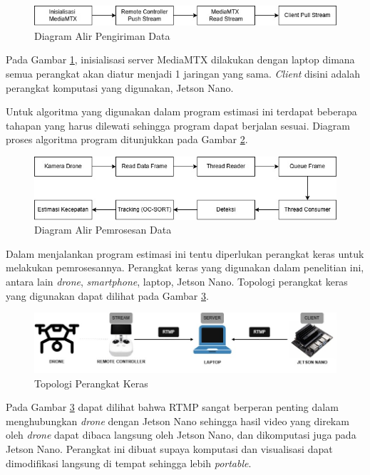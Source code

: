 \begin{figure} [H] \centering
  \includegraphics[scale=0.7]{bab3/pengirimandata.jpg}
  \caption{Diagram Alir Pengiriman Data}
  \label{fig:alurdata}
\end{figure}

Pada Gambar \ref{fig:alurdata}, inisialisasi server MediaMTX dilakukan dengan laptop dimana semua perangkat akan diatur menjadi 1 jaringan yang sama. \emph{Client} disini adalah perangkat komputasi yang digunakan, Jetson Nano.

Untuk algoritma yang digunakan dalam program estimasi ini terdapat beberapa tahapan yang harus dilewati sehingga program dapat berjalan sesuai. Diagram proses algoritma program ditunjukkan pada Gambar \ref{fig:diagramproses}.

\begin{figure} [H] \centering
  \includegraphics[scale=0.7]{bab3/algoritma.jpg}
  \caption{Diagram Alir Pemrosesan Data}
  \label{fig:diagramproses}
\end{figure}

Dalam menjalankan program estimasi ini tentu diperlukan perangkat keras untuk melakukan pemrosesannya. Perangkat keras yang digunakan dalam penelitian ini, antara lain \emph{drone}, \emph{smartphone}, laptop, Jetson Nano. Topologi perangkat keras yang digunakan dapat dilihat pada Gambar \ref{fig:topologihardware}.

\begin{figure} [H] \centering
  \includegraphics[scale=0.5]{bab3/topologi-hardware.jpg}
  \caption{Topologi Perangkat Keras}
  \label{fig:topologihardware}
\end{figure}

Pada Gambar \ref{fig:topologihardware} dapat dilihat bahwa RTMP sangat berperan penting dalam menghubungkan \emph{drone} dengan Jetson Nano sehingga hasil video yang direkam oleh \emph{drone} dapat dibaca langsung oleh Jetson Nano, dan dikomputasi juga pada Jetson Nano. Perangkat ini dibuat supaya komputasi dan visualisasi dapat dimodifikasi langsung di tempat sehingga lebih \emph{portable}.





